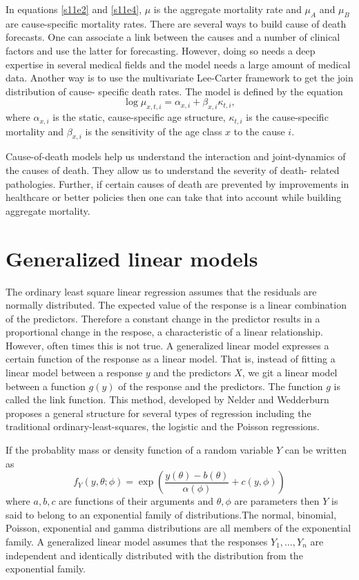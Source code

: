 \documentclass{article}
\numberwithin{equation}{section}
\begin{document}
In equations \eqref{s11e2} and \eqref{s11e4}, $\mu$ is the aggregate mortality
rate and $\mu_A$ and $\mu_B$ are cause-specific mortality rates. There are 
several ways to build cause of death forecasts. One can associate a link
between the causes and a number of clinical factors and use the latter for
forecasting. However, doing so needs a deep expertise in several medical fields
and the model needs a large amount of medical data. Another way is to use
the multivariate Lee-Carter framework to get the join distribution of cause-
specific death rates. The model is defined by the equation
\begin{equation}\label{s11e5}
\log\mu_{x,t,i} = \alpha_{x,i} + \beta_{x,i}\kappa_{t,i},
\end{equation}
where $\alpha_{x,i}$ is the static, cause-specific age structure, $\kappa_{t,i}$
is the cause-specific mortality and $\beta_{x,i}$ is the sensitivity of the
age class $x$ to the cause $i$. 

Cause-of-death models help us understand the interaction and joint-dynamics
of the causes of death. They allow us to understand the severity of death-
related pathologies. Further, if certain causes of death are prevented by
improvements in healthcare or better policies then one can take that into 
account while building aggregate mortality.

\section{Generalized linear models}\label{s12}
The ordinary least square linear regression assumes that the residuals are
normally distributed. The expected value of the response is a linear
combination of the predictors. Therefore a constant change in the predictor
results in a proportional change in the respose, a characteristic of a linear
relationship. However, often times this is not true. A generalized linear 
model expresses a certain function of the response as a linear model. That is,
instead of fitting a linear model between a response $y$ and the predictors $X$,
we git a linear model between a function $g(y)$ of the response and the
predictors. The function $g$ is called the link function. This method,
developed by Nelder and Wedderburn \cite{nelder1972generalized} proposes a 
general structure for several types of regression including the traditional
ordinary-least-squares, the logistic and the Poisson regressions. 

If the probablity mass or density function of a random variable $Y$ can be
written as
\begin{equation}\label{s12e1}
f_Y(y, \theta; \phi) = 
\exp\left(\frac{y(\theta) - b(\theta)}{\alpha(\phi)} + c(y, \phi)\right)
\end{equation}
where $a, b, c$ are functions of their arguments and $\theta, \phi$ are
parameters then $Y$ is said to belong to an exponential family of distributions.The normal, binomial, Poisson, exponential and gamma distributions are all
members of the exponential family. A generalized linear model assumes that
the responses $Y_1, \ldots, Y_n$ are independent and identically distributed
with the distribution from the exponential family. 
\end{document}
